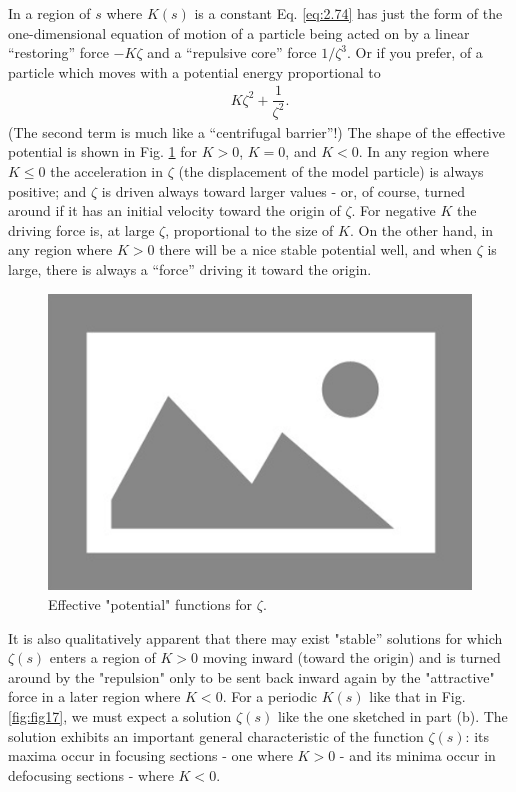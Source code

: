 In a region of $s$ where $K(s)$ is a constant Eq. \eqref{eq:2.74} has just the form of the
one-dimensional equation of motion of a particle being acted on by a linear “restoring” force $-K\zeta$ and a “repulsive core” force $1/\zeta^3$. Or if you prefer, of a particle which moves with a potential energy proportional to
\begin{align*}
	K \zeta^2 + \dfrac{1}{\zeta^2}.
\end{align*}
(The second term is much like a “centrifugal barrier”!) The shape of the effective potential is shown in Fig. \ref{fig:fig16} for $K > 0$, $K = 0$, and $K < 0$. In any region where $K \leq 0$ the acceleration in $\zeta$ (the displacement of the model particle) is always positive; and $\zeta$ is driven always toward larger values - or, of course, turned around
if it has an initial velocity toward the origin of $\zeta$. For negative $K$ the driving force
is, at large $\zeta$, proportional to the size of $K$. On the other hand, in any region
where $K > 0$ there will be a nice stable potential well, and when $\zeta$ is large, there
is always a “force” driving it toward the origin.

\begin{figure}[!htb]
	\centering
	\includegraphics[width=0.8\linewidth]{./Figuras/placeholder.png}
	\caption{Effective "potential" functions for $\zeta$.}
	\label{fig:fig16}
\end{figure}

It is also qualitatively apparent that there may exist "stable''  solutions for which $\zeta(s)$ enters a region of $K > 0$ moving inward (toward the origin) and is turned around by the "repulsion" only to be sent back inward again by the "attractive" force in a later region where $K < 0$. For a periodic $K(s)$ like that in Fig. \ref{fig:fig17}, we must expect a solution $\zeta(s)$ like the one sketched in part (b). The solution exhibits an important general characteristic of the function $\zeta(s)$: its maxima occur in focusing sections - one where $K > 0$ - and its minima occur in defocusing sections - where $K < 0$.

